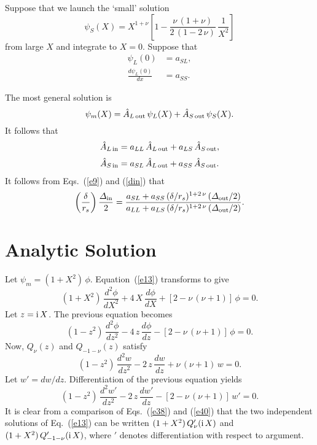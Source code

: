 \documentclass[12pt,prb,aps,notitlepage]{revtex4-1}
\begin{document}
Suppose that we launch the  `small' solution 
\begin{equation}
\psi_S(X) = X^{1+\nu}\left[1-\frac{\nu\,(1+\nu)}{2\,(1-2\,\nu)}\,\frac{1}{X^2}\right]
\end{equation}
from large $X$ and integrate to  $X=0$. Suppose that 
\begin{align}
\psi_L(0) &= a_{SL},\\[0.5ex]
\frac{d\psi_L(0)}{dx} &= a_{SS}.
\end{align}

The most general solution is
\begin{equation}
\psi_m(X) = \hat{A}_{L\,{\rm out}}\,\psi_L(X)+ \hat{A}_{S\,{\rm out}}\,\psi_S(X).
\end{equation}
It follows that
\begin{align}\label{bin}
\hat{A}_{L\,{\rm in}} &= a_{LL}\,\hat{A}_{L\,{\rm out}} + a_{LS}\,\hat{A}_{S\,{\rm out}},\\[0.5ex]
\hat{A}_{S\,{\rm in}}&= a_{SL}\,\hat{A}_{L\,{\rm out}} + a_{SS}\,\hat{A}_{S\,{\rm out}}.\label{bout}
\end{align}
It follows from Eqs.~(\ref{e9}) and (\ref{din}) that
\begin{equation}
\left(\frac{\delta}{r_s}\right)\frac{{\mit\Delta}_{\rm in}}{2}= \frac{a_{SL} +a_{SS}\,(\delta/r_s)^{1+2\,\nu}\,({\mit\Delta}_{\rm out}/2)}
{a_{LL}  +a_{LS}\,(\delta/r_s)^{1+2\,\nu}\,({\mit\Delta}_{\rm out}/2)}.
\end{equation}

\section{Analytic Solution}
Let $\psi_m = (1+X^2)\,\phi$. Equation~(\ref{e13}) transforms to give
\begin{equation}
(1+X^2)\,\frac{d^2\phi}{dX^2} + 4\,X\,\frac{d\phi}{dX} + [2-\nu\,(\nu+1)]\,\phi=0.
\end{equation}
Let $z= {\rm i}\,X$. The previous equation becomes 
\begin{equation}\label{e38}
(1-z^2)\,\frac{d^2\phi}{dz^2} - 4\,z\,\frac{d\phi}{dz} - [2-\nu\,(\nu+1)]\,\phi=0.
\end{equation}
Now, $Q_\nu(z)$ and $Q_{-1-\nu}(z)$ satisfy
\begin{equation}
(1-z^2)\,\frac{d^2 w}{dz^2} - 2\,z\,\frac{dw}{dz} + \nu\,(\nu+1)\,w = 0.
\end{equation}
Let $w'=dw/dz$. Differentiation of the previous equation yields
\begin{equation}\label{e40}
(1-z^2)\,\frac{d^2w'}{dz^2} - 2\,z\,\frac{dw'}{dz} - [2-\nu\,(\nu+1)]\,w'=0.
\end{equation}
It is clear from a comparison of Eqs.~(\ref{e38}) and (\ref{e40}) that the two independent solutions of Eq.~(\ref{e13}) can be written 
$(1+X^2)\,Q_\nu'({\rm i}\,X)$ and $(1+X^2)\,Q_{-1-\nu}'({\rm i}\,X)$, where $'$ denotes differentiation with respect to argument. 
\end{document}
